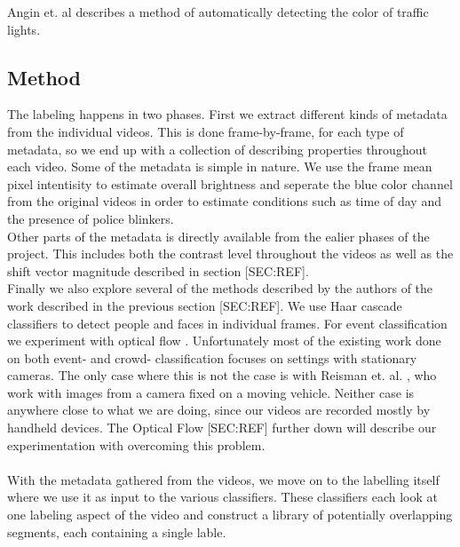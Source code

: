 %
%
%
Angin et. al \cite{10.1109/MDM.2010.71} describes a method of automatically detecting the color of traffic lights.
%
%
\subsection{Method}
%
The labeling happens in two phases. First we extract different kinds of metadata from the individual videos. This is done frame-by-frame, for each type of metadata, so we end up with a collection of describing properties throughout each video. Some of the metadata is simple in nature. We use the frame mean pixel intentisity to estimate overall brightness and seperate the blue color channel from the original videos in order to estimate conditions such as time of day and the presence of police blinkers.\\
Other parts of the metadata is directly available from the ealier phases of the project. This includes both the contrast level throughout the videos as well as the shift vector magnitude described in section [SEC:REF].\\
Finally we also explore several of the methods described by the authors of the work described in the previous section [SEC:REF]. We use Haar cascade classifiers \cite{viola01}\cite{lienhart01}\cite{schmidt01}\cite{schmidt02} to detect people and faces in individual frames. For event classification we experiment with optical flow \cite{Bouguet2000}. Unfortunately most of the existing work done on both event- and crowd- classification focuses on settings with stationary cameras. The only case where this is not the case is with Reisman et. al. \cite{CrowdDetectionInVideoSequences}, who work with images from a camera fixed on a moving vehicle. Neither case is anywhere close to what we are doing, since our videos are recorded mostly by handheld devices. The Optical Flow [SEC:REF] further down will describe our experimentation with overcoming this problem.\\
\\
With the metadata gathered from the videos, we move on to the labelling itself where we use it as input to the various classifiers. These classifiers each look at one labeling aspect of the video and construct a library of potentially overlapping segments, each containing a single lable.\\
